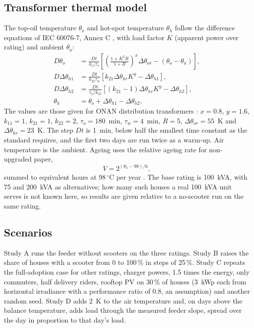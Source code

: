 \documentclass[conference]{IEEEtran}
\begin{document}
\subsection{Transformer thermal model}
The top-oil temperature $\theta_o$ and hot-spot temperature $\theta_h$ follow
the difference equations of IEC 60076-7, Annex C \cite{iec60076}, with load
factor $K$ (apparent power over rating) and ambient $\theta_a$:
\begin{align}
D\theta_o &= \frac{Dt}{k_{11}\tau_o}\left[\left(\frac{1+K^2R}{1+R}\right)^{x}\Delta\theta_{or} - (\theta_o-\theta_a)\right],\\
D\Delta\theta_{h1} &= \frac{Dt}{k_{22}\tau_w}\left[k_{21}\Delta\theta_{hr}K^{y} - \Delta\theta_{h1}\right],\\
D\Delta\theta_{h2} &= \frac{Dt}{\tau_o/k_{22}}\left[(k_{21}-1)\Delta\theta_{hr}K^{y} - \Delta\theta_{h2}\right],\\
\theta_h &= \theta_o + \Delta\theta_{h1} - \Delta\theta_{h2}.
\end{align}
The values are those given for ONAN distribution transformers
\cite{iec60076,is2026}: $x=0.8$, $y=1.6$, $k_{11}=1$, $k_{21}=1$, $k_{22}=2$,
$\tau_o=180$~min, $\tau_w=4$~min, $R=5$, $\Delta\theta_{or}=55$~K and
$\Delta\theta_{hr}=23$~K. The step $Dt$ is 1~min, below half the smallest
time constant as the standard requires, and the first two days are run twice
as a warm-up. Air temperature is the ambient. Ageing uses the relative ageing
rate for non-upgraded paper,
\begin{equation}
V = 2^{(\theta_h - 98)/6},
\end{equation}
summed to equivalent hours at 98\,$^\circ$C per year \cite{iec60076}. The base
rating is 100~kVA, with 75 and 200~kVA as alternatives; how many such houses
a real 100~kVA unit serves is not known here, so results are given relative
to a no-scooter run on the same rating.

\subsection{Scenarios}
Study A runs the feeder without scooters on the three ratings. Study B raises
the share of houses with a scooter from 0 to 100\,\% in steps of 25\,\%.
Study C repeats the full-adoption case for other ratings, charger powers,
1.5 times the energy, only commuters, half delivery riders, rooftop PV on
30\,\% of houses (3~kWp each from horizontal irradiance with a
performance ratio of 0.8, an assumption) and
another random seed. Study D adds 2~K to the air temperature and, on days
above the balance temperature, adds load through the measured feeder slope,
spread over the day in proportion to that day's load.
\end{document}
